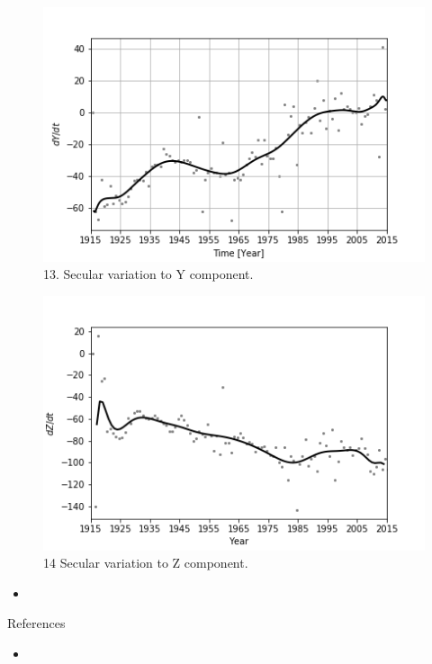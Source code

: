 \documentclass[final,t]{beamer}
\begin{document}
\begin{columns}[t]
\begin{column}{.33\linewidth}
\begin{block}{}
	\begin{figure}
		\centering
		\includegraphics[width=0.7\linewidth]{spline100sv_y_spline}
		\caption{13. Secular variation to Y component.}
		\label{SPLINEy}
	\end{figure}
	
	\begin{figure}
		\centering
		\includegraphics[width=0.7\linewidth]{spline100sv_z_spline}
		\caption{14 Secular variation to Z component.}
		\label{Splinez}
	\end{figure}

\begin{itemize}
	\item
\end{itemize}
\vspace{-0.2cm}
\end{block}

\begin{block}{References}

\begin{itemize}
\item
\end{itemize}
\vspace{-0.2cm}
\end{block}

\end{column}

\end{columns}
\end{document}
